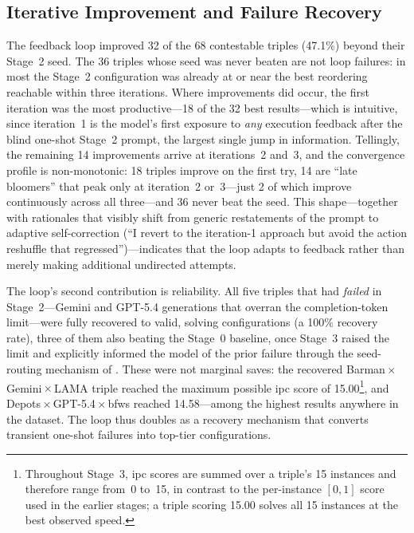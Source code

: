 \subsection{Iterative Improvement and Failure Recovery}
\label{sec:results:stage3:efficacy}

The feedback loop improved 32 of the 68 contestable triples (47.1\%) beyond their Stage~2 seed. The 36 triples whose seed was never beaten are not loop failures: in most the Stage~2 configuration was already at or near the best reordering reachable within three iterations. Where improvements did occur, the first iteration was the most productive---18 of the 32 best results---which is intuitive, since iteration~1 is the model's first exposure to \emph{any} execution feedback after the blind one-shot Stage~2 prompt, the largest single jump in information. Tellingly, the remaining 14 improvements arrive at iterations~2 and~3, and the convergence profile is non-monotonic: 18 triples improve on the first try, 14 are ``late bloomers'' that peak only at iteration~2 or~3---just 2 of which improve continuously across all three---and 36 never beat the seed. This shape---together with rationales that visibly shift from generic restatements of the prompt to adaptive self-correction (``I revert to the iteration-1 approach but avoid the action reshuffle that regressed'')---indicates that the loop adapts to feedback rather than merely making additional undirected attempts.

The loop's second contribution is reliability. All five triples that had \emph{failed} in Stage~2---Gemini and GPT-5.4 generations that overran the completion-token limit---were fully recovered to valid, solving configurations (a 100\% recovery rate), three of them also beating the Stage~0 baseline, once Stage~3 raised the limit and explicitly informed the model of the prior failure through the seed-routing mechanism of . These were not marginal saves: the recovered Barman\,$\times$\,Gemini\,$\times$\,LAMA triple reached the maximum possible \gls{ipc} score of 15.00\footnote{Throughout Stage~3, \gls{ipc} scores are summed over a triple's 15 instances and therefore range from~0 to~15, in contrast to the per-instance $[0,1]$ score used in the earlier stages; a triple scoring 15.00 solves all 15 instances at the best observed speed.}, and Depots\,$\times$\,GPT-5.4\,$\times$\,\gls{bfws} reached 14.58---among the highest results anywhere in the dataset. The loop thus doubles as a recovery mechanism that converts transient one-shot failures into top-tier configurations.

